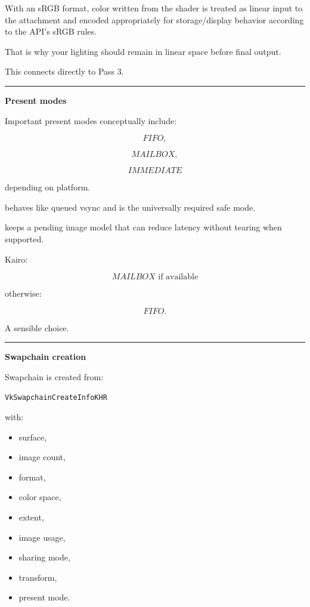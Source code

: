 With an sRGB format, color written from the shader is treated as linear input to the attachment and encoded appropriately for storage/display behavior according to the API's sRGB rules.

That is why your lighting should remain in linear space before final output.

This connects directly to Pass 3.

\begin{center}\rule{0.5\linewidth}{0.5pt}\end{center}

\textbf{Present modes}

Important present modes conceptually include:

\[
FIFO,
\]

\[
MAILBOX,
\]

\[
IMMEDIATE
\]

depending on platform.

 behaves like queued vsync and is the universally required safe mode.

 keeps a pending image model that can reduce latency without tearing when supported.

Kairo:

\[
\boxed{
MAILBOX\text{ if available}
}
\]

otherwise:

\[
\boxed{
FIFO.
}
\]

A sensible choice.

\begin{center}\rule{0.5\linewidth}{0.5pt}\end{center}

\textbf{Swapchain creation}

Swapchain is created from:

\begin{verbatim}
VkSwapchainCreateInfoKHR
\end{verbatim}

with:

\begin{itemize}
\tightlist
\item
  surface,
\item
  image count,
\item
  format,
\item
  color space,
\item
  extent,
\item
  image usage,
\item
  sharing mode,
\item
  transform,
\item
  present mode.
\end{itemize}

